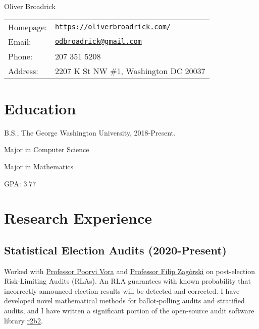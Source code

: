 \documentclass[letterpaper]{article}
\def\name{Oliver Broadrick}
\renewenvironment{itemize}{
  \begin{list}{}{
    \setlength{\leftmargin}{1.5em}
  }
}{
  \end{list}
}
\begin{document}
{\huge \name}

\vspace{0.25in}

\begin{minipage}{0.45\linewidth}
  \begin{tabular}{ll}
    Homepage: & \href{https://oliverbroadrick.com/}{\tt https://oliverbroadrick.com/} \\
    Email: & \href{mailto:odbroadrick@gmail.com}{\tt odbroadrick@gmail.com} \\
    Phone: & 207 351 5208 \\
    Address: & 2207 K St NW \#1, Washington DC 20037
  \end{tabular}
\end{minipage}


\section*{Education}

\begin{itemize}

\item B.S., The George Washington University, 2018-Present.
\begin{itemize}
  \item Major in Computer Science
  \item Major in Mathematics
  \item GPA: 3.77
\end{itemize}

\end{itemize}


\section*{Research Experience}

\subsection*{Statistical Election Audits (2020-Present)}
Worked with \href{https://www2.seas.gwu.edu/~poorvi/}{Professor Poorvi Vora} and 
\href{https://zagorski.im.pwr.wroc.pl/}{Professor Filip Zag\`{o}rski} on post-election
Risk-Limiting Audits (RLAs). An RLA guarantees with known probability that incorrectly
announced election results will be detected and corrected.
I have developed novel mathematical methods for ballot-polling audits and stratified audits, 
and I have written a significant portion of the open-source audit software library 
\href{https://github.com/gwexploratoryaudits/r2b2}{r2b2}.
\end{document}
